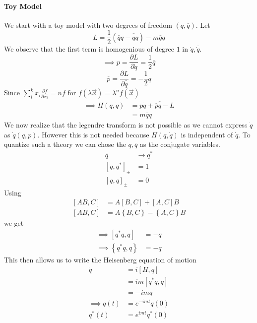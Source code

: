 \documentclass{report}
\begin{document}
\paragraph{Toy Model}
We start with a toy model with two degrees of freedom $\left( q, \overline{q} \right) $. Let \[
L = \frac{1}{2} \left( \overline{q} \dot{q} - \overline{\dot{q}} q \right) - m \overline{q}q
\] 
We observe that the first term is homogenious of degree $1$ in $\dot{q}, \overline{\dot{q}} $. \[
\implies p = \frac{\partial L}{\partial \dot{q}} = \frac{1}{2} \overline{q}
\] \[
\overline{p} = \frac{\partial L}{\partial \overline{\dot{q}} } = - \frac{1}{2} q
\] 
Since $ \sum_{i}^{k} x_i \frac{\partial f}{\partial x_i} = n f $ for $f\left( \lambda \vec{x} \right) = \lambda^{n} f\left( \vec{x} \right) $
\begin{align*}
  \implies H\left( q, \dot{q} \right) &= p \dot{q} + \overline{p} \overline{\dot{q}} - L\\
  &=  m \overline{q} q 
\end{align*}
We now realize that the legendre transform is not possible as we cannot express $\dot{q} $ as $\dot{q}\left( q,p \right) $. However this is not needed because $H\left( q,\dot{q} \right) $ is independent of $\dot{q}$. To quantize such a theory  we can chose the $q, \overline{q}$ as the conjugate variables.
\begin{align*}
  \overline{q} &\to q^{*} \\
  \left[ q, q^{*}  \right] _{\pm} &= 1 \\
  \left[ q, q \right] _{\pm} &= 0
\end{align*}
Using 
\begin{align*}
  \left[ AB, C \right] &= A \left[ B, C \right] + \left[ A, C \right] B \\
  \left[ AB, C \right] &= A \left\{ B, C \right\} - \left\{ A, C \right\} B
\end{align*}
we get
\begin{align*}
  \implies \left[ q^{*} q, q \right] &= -q \\
  \implies \left\{ q^{*} q, q \right\} &= -q
\end{align*}
This then allows us to write the Heisenberg equation of motion
\begin{align*}
  \dot{q} &= i \left[ H, q \right]  \\
  &= im \left[ q^{*} q, q \right]  \\
  &= -imq \\
  \implies q\left( t \right) &=  e^{-imt} q\left( 0 \right)   \\
  q^{*} \left( t \right) &= e^{imt} q^{*} \left( 0 \right) 
\end{align*}
\end{document}
